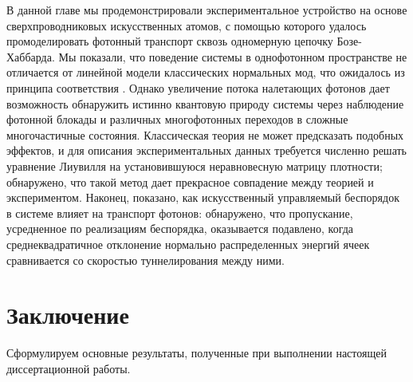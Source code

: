 \documentclass[14pt, a4paper]{extreport}
\numberwithin{equation}{section}
\begin{document}
В данной главе мы продемонстрировали экспериментальное устройство на основе сверхпроводниковых искусственных атомов, с помощью которого удалось промоделировать фотонный транспорт сквозь одномерную цепочку Бозе-Хаббарда. Мы показали, что поведение системы в однофотонном пространстве не отличается от линейной модели классических нормальных мод, что ожидалось из принципа соответствия \cite{park2012classical}. Однако увеличение потока налетающих фотонов дает возможность обнаружить истинно квантовую природу системы через наблюдение фотонной блокады и различных многофотонных переходов в сложные многочастичные состояния. Классическая теория не может предсказать подобных эффектов, и для описания экспериментальных данных требуется численно решать уравнение Лиувилля на установившуюся неравновесную матрицу плотности; обнаружено, что такой метод дает прекрасное совпадение между теорией и экспериментом. Наконец, показано, как искусственный управляемый беспорядок в системе влияет на транспорт фотонов: обнаружено, что пропускание, усредненное по реализациям беспорядка, оказывается подавлено, когда среднеквадратичное отклонение нормально распределенных энергий ячеек сравнивается со скоростью туннелирования между ними.

\chapter{Заключение}

Сформулируем основные результаты, полученные при выполнении настоящей диссертационной работы.
\end{document}
